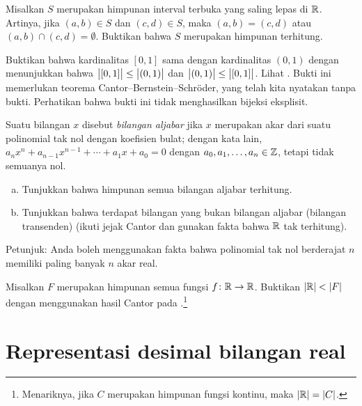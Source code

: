 \begin{exercise}
Misalkan $S$ merupakan himpunan interval terbuka yang saling lepas di ${\mathbb{R}}$.  Artinya,
jika $(a,b) \in S$ dan $(c,d) \in S$, maka $(a,b) = (c,d)$
atau $(a,b) \cap (c,d) = \emptyset$.  Buktikan bahwa $S$ merupakan himpunan terhitung.
\end{exercise}

\begin{exercise}
Buktikan bahwa kardinalitas $[0,1]$ sama dengan kardinalitas
$(0,1)$ dengan menunjukkan bahwa
$\bigl\lvert {[0,1]} \bigr\rvert \leq \bigl\lvert {(0,1)} \bigr\rvert$ dan
$\bigl\lvert {(0,1)} \bigr\rvert \leq \bigl\lvert {[0,1]} \bigr\rvert$.
Lihat .
Bukti ini memerlukan teorema Cantor--Bernstein--Schr\"oder, yang telah kita
nyatakan tanpa bukti.  Perhatikan bahwa bukti ini tidak menghasilkan
bijeksi eksplisit.
\end{exercise}

\begin{exercise}[Menantang]
Suatu bilangan $x$ disebut \emph{bilangan aljabar} jika $x$ merupakan akar dari
suatu polinomial tak nol dengan
koefisien bulat; dengan kata lain, $a_n x^n + a_{n-1} x^{n-1} + \cdots
+ a_1 x + a_0 = 0$ dengan $a_0,a_1,\ldots,a_n \in {\mathbb{Z}}$, tetapi tidak semuanya nol.
\begin{enumerate}[a)]
\item
Tunjukkan bahwa himpunan semua
bilangan aljabar terhitung.
\item
Tunjukkan bahwa terdapat bilangan yang bukan bilangan aljabar (bilangan transenden)
(ikuti jejak Cantor dan gunakan fakta bahwa ${\mathbb{R}}$ tak terhitung).
\end{enumerate}
Petunjuk: Anda boleh menggunakan fakta bahwa polinomial tak nol berderajat $n$ memiliki paling banyak $n$ akar
real.
\end{exercise}

\begin{exercise}[Menantang]
Misalkan $F$ merupakan himpunan semua fungsi $f \colon {\mathbb{R}} \to {\mathbb{R}}$.
Buktikan $\lvert {{\mathbb{R}}} \rvert < \lvert {F} \rvert$
dengan menggunakan hasil Cantor pada .\footnote{Menariknya,
jika $C$ merupakan himpunan fungsi kontinu, maka $\lvert {{\mathbb{R}}} \rvert = \lvert {C} \rvert$.}
\end{exercise}


\sectionnewpage
\section{Representasi desimal bilangan real}
\label{sec:decimals}

